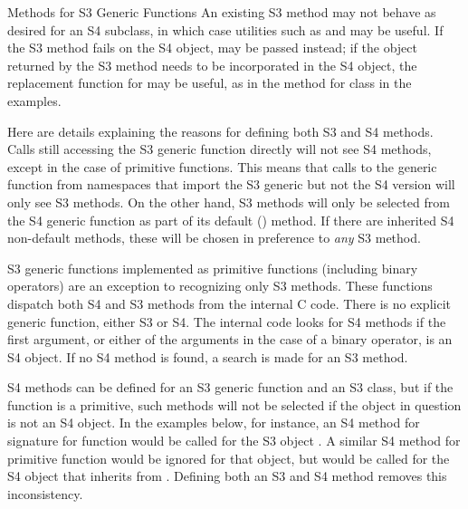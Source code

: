 \begin{Section}{Methods for S3 Generic Functions}
An existing S3 method may not behave as desired for an S4 subclass, in
which case utilities such as  and
 may be useful.  If the S3 method fails on the S4
object,  may be passed instead; if the object returned
by the S3 method needs to be incorporated in the S4 object, the
replacement function for  may be useful, as in the method
for class  in the examples.

Here are details explaining the reasons for defining both S3 and S4 methods.
Calls still accessing the S3 generic function
directly will not see S4 methods, except in the case of primitive
functions.
This means that calls to the generic function from namespaces that
import the S3 generic but not the S4 version will only see S3
methods.
On the other hand, S3 methods will only be selected from the
S4 generic function as part of its default () method.
If there are inherited S4 non-default methods, these will be chosen in
preference to \emph{any} S3 method.

S3 generic functions implemented as primitive functions (including
binary operators) are an exception to recognizing only
S3 methods.
These functions dispatch both S4 and S3 methods from
the internal C code.
There is no explicit generic function, either S3 or S4.
The internal code looks for S4 methods if the first
argument, or either of the arguments in the case of a binary operator,
is an S4 object.
If no S4 method is found, a search is made for an S3 method.

S4 methods can be defined for an S3 generic function and an S3 class,
but if the function is a primitive, such methods will not be selected
if the object in question is not an S4 object.
In the examples below, for instance,  an S4 method for signature
 for function  would be called for the
S3 object .
A similar S4 method for primitive function
\code{`[`} would be ignored for that object, but would be called for
the S4 object  that inherits from .
Defining both an S3 and S4 method removes this inconsistency.


\end{Section}
%

